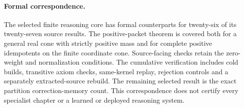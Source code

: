 \paragraph{Formal correspondence.}
The selected finite reasoning core has formal counterparts for twenty-six of its
twenty-seven source results. The positive-packet theorem is covered both for a
general real cone with strictly positive mass and for complete positive
idempotents on the finite coordinate cone. Source-facing checks retain the
zero-weight and normalization conditions. The cumulative verification includes
cold builds, transitive axiom checks, same-kernel replay, rejection controls and a
separately extracted-source rebuild. The remaining selected result is the exact
partition correction-memory count. This correspondence does not certify every
specialist chapter or a learned or deployed reasoning system.
